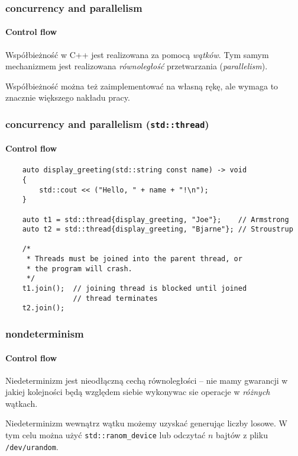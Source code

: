 \documentclass[aspectratio=169]{beamer}
\begin{document}
\begin{frame}
    \frametitle{concurrency and parallelism}
    \framesubtitle{Control flow}

    Współbieżność w C++ jest realizowana za pomocą \emph{wątków}. Tym samym
    mechanizmem jest realizowana \emph{równoległość} przetwarzania
    (\emph{parallelism}).

    \vspace{1em}

    Współbieżność można też zaimplementować na własną rękę, ale wymaga to
    znacznie większego nakładu pracy.
\end{frame}

\begin{frame}[fragile]
    \frametitle{concurrency and parallelism ({\tt std::thread})}
    \framesubtitle{Control flow}

    {\footnotesize
    \begin{lstlisting}
    auto display_greeting(std::string const name) -> void
    {
        std::cout << ("Hello, " + name + "!\n");
    }

    auto t1 = std::thread{display_greeting, "Joe"};    // Armstrong
    auto t2 = std::thread{display_greeting, "Bjarne"}; // Stroustrup

    /*
     * Threads must be joined into the parent thread, or
     * the program will crash.
     */
    t1.join();  // joining thread is blocked until joined
                // thread terminates
    t2.join();
    \end{lstlisting}}
\end{frame}

\begin{frame}
    \frametitle{nondeterminism}
    \framesubtitle{Control flow}

    Niedeterminizm jest nieodłączną cechą równoległości -- nie mamy gwarancji w
    jakiej kolejności będą względem siebie wykonywac sie operacje w
    \emph{różnych} wątkach.

    \vspace{1em}

    Niedeterminizm wewnątrz wątku możemy uzyskać generując liczby losowe. W tym
    celu można użyć {\tt std::ranom\_device} lub odczytać $n$ bajtów z pliku
    {\tt /dev/urandom}.
\end{frame}
\end{document}
